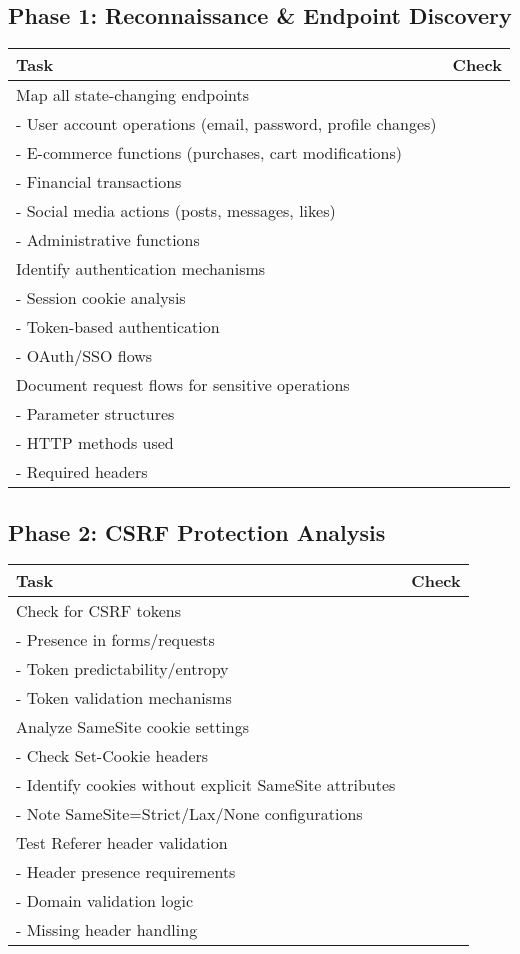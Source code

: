 \documentclass{article}
\begin{document}
\subsection*{Phase 1: Reconnaissance \& Endpoint Discovery}
\begin{tabular}{>{\raggedright\arraybackslash}p{}c}
    \toprule
    \textbf{Task} & \textbf{Check} \\
    \midrule
    Map all state-changing endpoints  \\
    \quad - User account operations (email, password, profile changes)  \\
    \quad - E-commerce functions (purchases, cart modifications)  \\
    \quad - Financial transactions  \\
    \quad - Social media actions (posts, messages, likes) \\
    \quad - Administrative functions   \\
    Identify authentication mechanisms \\
    \quad - Session cookie analysis  \\
    \quad - Token-based authentication  \\
    \quad - OAuth/SSO flows  \\
    Document request flows for sensitive operations \\
    \quad - Parameter structures  \\
    \quad - HTTP methods used  \\
    \quad - Required headers  \\
    \bottomrule
\end{tabular}

\subsection*{Phase 2: CSRF Protection Analysis}
\begin{tabular}{>{\raggedright\arraybackslash}p{}c}
    \toprule
    \textbf{Task} & \textbf{Check} \\
    \midrule
    Check for CSRF tokens  \\
    \quad - Presence in forms/requests  \\
    \quad - Token predictability/entropy  \\
    \quad - Token validation mechanisms  \\
    Analyze SameSite cookie settings  \\
    \quad - Check Set-Cookie headers  \\
    \quad - Identify cookies without explicit SameSite attributes  \\
    \quad - Note SameSite=Strict/Lax/None configurations  \\
    Test Referer header validation  \\
    \quad - Header presence requirements  \\
    \quad - Domain validation logic  \\
    \quad - Missing header handling  \\
    \bottomrule
\end{tabular}
\end{document}
